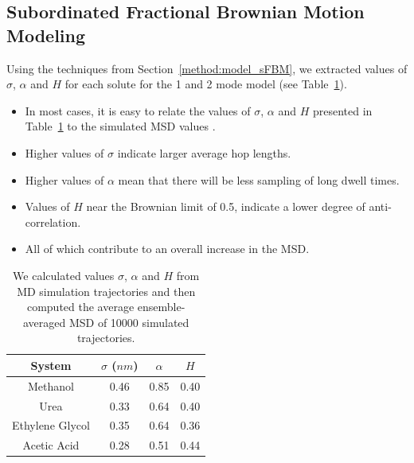 \documentclass{article}
\begin{document}
  \subsection{Subordinated Fractional Brownian Motion Modeling}\label{section:sFBM}
  
  Using the techniques from Section~\ref{method:model_sFBM}, we extracted values 
  of $\sigma$, $\alpha$ and $H$ for each solute for the 1 and 2 mode model 
  (see Table~\ref{table:sfbm_params}).
  \begin{itemize}
    \item In most cases, it is easy to relate the values of $\sigma$, $\alpha$ 
    and $H$ presented in Table~\ref{table:sfbm_params} to the simulated MSD values . 
  	\item Higher values of $\sigma$ indicate larger average hop lengths.
  	\item Higher values of $\alpha$ mean that there will be less sampling of 
  	long dwell times.
  	\item Values of $H$ near the Brownian limit of 0.5, indicate a lower degree
  	of anti-correlation.
  	\item All of which contribute to an overall increase in the MSD.
  \end{itemize}
  
  \begin{table}[h]
  \centering
  \begin{tabular}{cccc}
  \toprule
  System & $\sigma$ ($nm$) & $\alpha$ & $H$ \\
  \midrule
  Methanol & 0.46 & 0.85 & 0.40 \\
  Urea & 0.33 & 0.64 & 0.40 \\
  Ethylene Glycol & 0.35 & 0.64 & 0.36 \\
  Acetic Acid & 0.28 & 0.51 & 0.44 \\
  \bottomrule
  \end{tabular}
  \caption{We calculated values $\sigma$, $\alpha$ and $H$ from MD simulation
  trajectories and then computed the average ensemble-averaged MSD of 10000 
  simulated trajectories.}\label{table:sfbm_params}
  \end{table}
\end{document}
